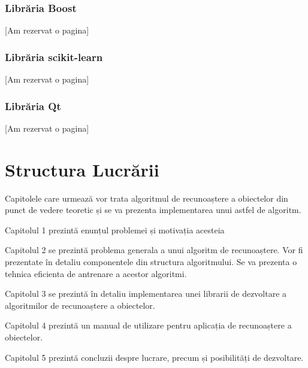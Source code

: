 



\subsubsection{Librăria Boost}
[Am rezervat o pagina]
\pagebreak


\subsubsection{Librăria scikit-learn}
[Am rezervat o pagina]
\pagebreak


\subsubsection{Librăria Qt}
[Am rezervat o pagina]
\pagebreak

\section{Structura Lucrării}
Capitolele care urmează vor trata algoritmul de recunoaștere a obiectelor din punct de vedere teoretic și se va prezenta implementarea unui astfel de algoritm.

Capitolul 1 prezintă enunțul problemei și motivația acesteia

Capitolul 2 se prezintă problema generala a unui algoritm de recunoaștere.
Vor fi prezentate în detaliu componentele din structura algoritmului.
Se va prezenta o tehnica eficienta de antrenare a acestor algoritmi.

Capitolul 3 se prezintă în detaliu implementarea unei librarii de dezvoltare a algoritmilor de recunoaștere a obiectelor.

Capitolul 4 prezintă un manual de utilizare pentru aplicația de recunoaștere a obiectelor.

Capitolul 5 prezintă concluzii despre lucrare, precum și posibilități de dezvoltare.

\pagebreak